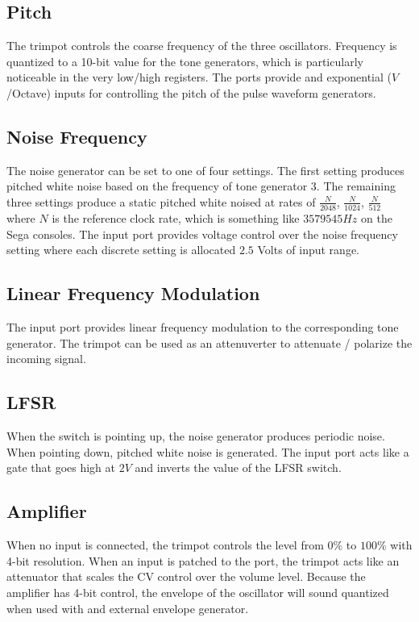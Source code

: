 \documentclass[12pt,letter]{article}
\begin{document}
\subsection{Pitch}

The trimpot controls the coarse frequency of the three oscillators. Frequency
is quantized to a 10-bit value for the tone generators, which is particularly
noticeable in the very low/high registers. The ports provide and exponential
($V$/Octave) inputs for controlling the pitch of the pulse waveform
generators.

\subsection{Noise Frequency}

The noise generator can be set to one of four settings. The first setting
produces pitched white noise based on the frequency of tone generator 3. The
remaining three settings produce a static pitched white noised at rates of
$\frac{N}{2048}$, $\frac{N}{1024}$, $\frac{N}{512}$ where $N$ is the reference
clock rate, which is something like $3579545Hz$ on the Sega consoles. The input
port provides voltage control over the noise frequency setting where each
discrete setting is allocated $2.5$ Volts of input range.

\subsection{Linear Frequency Modulation}

The input port provides linear frequency modulation to the corresponding tone
generator. The trimpot can be used as an attenuverter to attenuate / polarize
the incoming signal.

\subsection{LFSR}

When the switch is pointing up, the noise generator produces periodic noise.
When pointing down, pitched white noise is generated. The input port acts like
a gate that goes high at $2V$ and inverts the value of the LFSR switch.

\subsection{Amplifier}

When no input is connected, the trimpot controls the level from $0\%$ to
$100\%$ with 4-bit resolution. When an input is patched to the port, the
trimpot acts like an attenuator that scales the CV control over the volume
level. Because the amplifier has 4-bit control, the envelope of the oscillator
will sound quantized when used with and external envelope generator.
\end{document}

